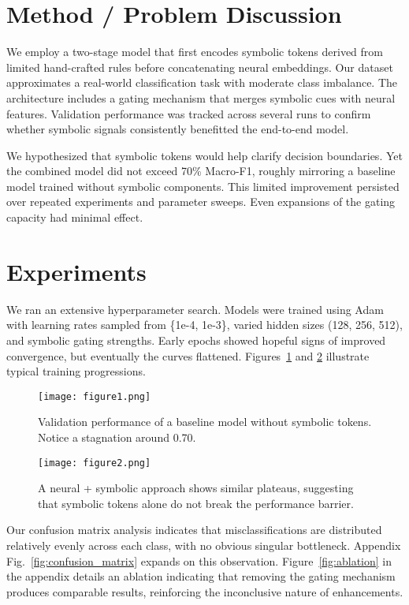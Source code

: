 \documentclass[12pt]{article}
\begin{document}
\section{Method / Problem Discussion}
We employ a two-stage model that first encodes symbolic tokens derived from limited hand-crafted rules before concatenating neural embeddings. Our dataset approximates a real-world classification task with moderate class imbalance. The architecture includes a gating mechanism that merges symbolic cues with neural features. Validation performance was tracked across several runs to confirm whether symbolic signals consistently benefitted the end-to-end model.

We hypothesized that symbolic tokens would help clarify decision boundaries. Yet the combined model did not exceed 70\% Macro-F1, roughly mirroring a baseline model trained without symbolic components. This limited improvement persisted over repeated experiments and parameter sweeps. Even expansions of the gating capacity had minimal effect.

\section{Experiments}
We ran an extensive hyperparameter search. Models were trained using Adam with learning rates sampled from \{1e-4, 1e-3\}, varied hidden sizes (128, 256, 512), and symbolic gating strengths. Early epochs showed hopeful signs of improved convergence, but eventually the curves flattened. Figures~\ref{fig:baseline} and \ref{fig:symbolic} illustrate typical training progressions.

\begin{figure}[t]
\centering
\texttt{[image: figure1.png]}
\caption{Validation performance of a baseline model without symbolic tokens. Notice a stagnation around 0.70.}
\label{fig:baseline}
\end{figure}

\begin{figure}[t]
\centering
\texttt{[image: figure2.png]}
\caption{A neural + symbolic approach shows similar plateaus, suggesting that symbolic tokens alone do not break the performance barrier.}
\label{fig:symbolic}
\end{figure}

Our confusion matrix analysis indicates that misclassifications are distributed relatively evenly across each class, with no obvious singular bottleneck. Appendix Fig.~\ref{fig:confusion_matrix} expands on this observation. Figure~\ref{fig:ablation} in the appendix details an ablation indicating that removing the gating mechanism produces comparable results, reinforcing the inconclusive nature of enhancements.
\end{document}
